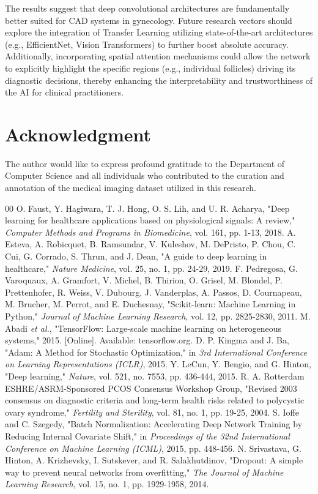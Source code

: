\documentclass[conference]{IEEEtran}
\begin{document}
The results suggest that deep convolutional architectures are fundamentally better suited for CAD systems in gynecology. Future research vectors should explore the integration of Transfer Learning utilizing state-of-the-art architectures (e.g., EfficientNet, Vision Transformers) to further boost absolute accuracy. Additionally, incorporating spatial attention mechanisms could allow the network to explicitly highlight the specific regions (e.g., individual follicles) driving its diagnostic decisions, thereby enhancing the interpretability and trustworthiness of the AI for clinical practitioners.

\section*{Acknowledgment}
The author would like to express profound gratitude to the Department of Computer Science and all individuals who contributed to the curation and annotation of the medical imaging dataset utilized in this research.

\begin{thebibliography}{00}
 O. Faust, Y. Hagiwara, T. J. Hong, O. S. Lih, and U. R. Acharya, "Deep learning for healthcare applications based on physiological signals: A review," \textit{Computer Methods and Programs in Biomedicine}, vol. 161, pp. 1-13, 2018.
 A. Esteva, A. Robicquet, B. Ramsundar, V. Kuleshov, M. DePristo, P. Chou, C. Cui, G. Corrado, S. Thrun, and J. Dean, "A guide to deep learning in healthcare," \textit{Nature Medicine}, vol. 25, no. 1, pp. 24-29, 2019.
 F. Pedregosa, G. Varoquaux, A. Gramfort, V. Michel, B. Thirion, O. Grisel, M. Blondel, P. Prettenhofer, R. Weiss, V. Dubourg, J. Vanderplas, A. Passos, D. Cournapeau, M. Brucher, M. Perrot, and E. Duchesnay, "Scikit-learn: Machine Learning in Python," \textit{Journal of Machine Learning Research}, vol. 12, pp. 2825-2830, 2011.
 M. Abadi \textit{et al.}, "TensorFlow: Large-scale machine learning on heterogeneous systems," 2015. [Online]. Available: tensorflow.org.
 D. P. Kingma and J. Ba, "Adam: A Method for Stochastic Optimization," in \textit{3rd International Conference on Learning Representations (ICLR)}, 2015.
 Y. LeCun, Y. Bengio, and G. Hinton, "Deep learning," \textit{Nature}, vol. 521, no. 7553, pp. 436-444, 2015.
 R. A. Rotterdam ESHRE/ASRM-Sponsored PCOS Consensus Workshop Group, "Revised 2003 consensus on diagnostic criteria and long-term health risks related to polycystic ovary syndrome," \textit{Fertility and Sterility}, vol. 81, no. 1, pp. 19-25, 2004.
 S. Ioffe and C. Szegedy, "Batch Normalization: Accelerating Deep Network Training by Reducing Internal Covariate Shift," in \textit{Proceedings of the 32nd International Conference on Machine Learning (ICML)}, 2015, pp. 448-456.
 N. Srivastava, G. Hinton, A. Krizhevsky, I. Sutskever, and R. Salakhutdinov, "Dropout: A simple way to prevent neural networks from overfitting," \textit{The Journal of Machine Learning Research}, vol. 15, no. 1, pp. 1929-1958, 2014.
\end{thebibliography}
\end{document}

